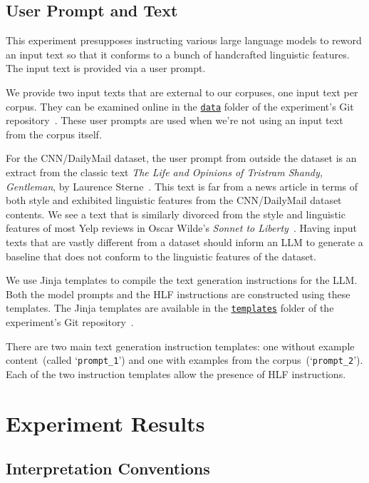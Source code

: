 \documentclass[runningheads,a4paper,11pt]{article}
\begin{document}
\subsection{User Prompt and Text}\label{input-text}

This experiment presupposes instructing various large language models to reword
an input text so that it conforms to a bunch of handcrafted linguistic features.
The input text is provided via a user prompt.

We provide two input texts that are external to our corpuses, one input text per
corpus.
They can be examined online in the
\texttt{\href{https://github.com/koosie0507/llm-tst-consistency/tree/main/data}{data}}
folder of the experiment's Git repository~\cite{olar2024experimentcode}.
These user prompts are used when we're not using an input text from the
corpus itself.

For the CNN/DailyMail dataset, the user prompt from outside the dataset is an
extract from the classic text \textit{The Life and Opinions of Tristram Shandy,
Gentleman}, by Laurence Sterne~\cite{sterne2003life}.
This text is far from a news article in terms of both style and exhibited
linguistic features from the CNN/DailyMail dataset contents.
We see a text that is similarly divorced from the style and linguistic
features of most Yelp reviews in Oscar Wilde's \textit{Sonnet to
Liberty}~\cite{wilde1909poems}.
Having input texts that are vastly different from a dataset should inform an LLM
to generate a baseline that does not conform to the linguistic features of the
dataset.

We use Jinja templates to compile the text generation instructions for the LLM.
Both the model prompts and the HLF instructions are constructed using these
templates.
The Jinja templates are available in the 
\texttt{\href{https://github.com/koosie0507/llm-tst-consistency/tree/main/data}{templates}}
folder of the experiment's Git repository~\cite{olar2024experimentcode}.

There are two main text generation instruction templates: one without example
content~(called `\texttt{prompt\_1}') and one with examples from the
corpus~(`\texttt{prompt\_2}').
Each of the two instruction templates allow the presence of HLF instructions.

\section{Experiment Results}

\subsection{Interpretation Conventions}
\end{document}

